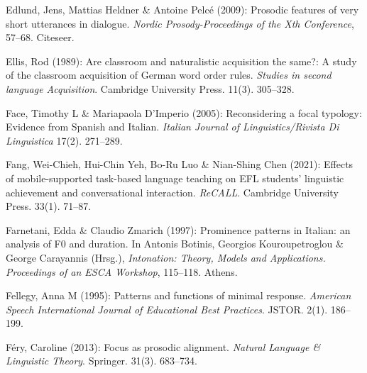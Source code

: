 \begin{styleBibliography}
Edlund, Jens, Mattias Heldner \& Antoine Pelcé (2009): Prosodic features of very short utterances in dialogue. \textit{Nordic Prosody-Proceedings of the Xth Conference}, 57–68. Citeseer.
\end{styleBibliography}

\begin{styleBibliography}
Ellis, Rod (1989): Are classroom and naturalistic acquisition the same?: A study of the classroom acquisition of German word order rules. \textit{Studies in second language Acquisition}. Cambridge University Press. 11(3). 305–328.
\end{styleBibliography}

\begin{styleBibliography}
Face, Timothy L \& Mariapaola D’Imperio (2005): Reconsidering a focal typology: Evidence from Spanish and Italian. \textit{Italian Journal of Linguistics/Rivista Di Linguistica} 17(2). 271–289.
\end{styleBibliography}

\begin{styleBibliography}
Fang, Wei-Chieh, Hui-Chin Yeh, Bo-Ru Luo \& Nian-Shing Chen (2021): Effects of mobile-supported task-based language teaching on EFL students’ linguistic achievement and conversational interaction. \textit{ReCALL}. Cambridge University Press. 33(1). 71–87.
\end{styleBibliography}

\begin{styleBibliography}
Farnetani, Edda \& Claudio Zmarich (1997): Prominence patterns in Italian: an analysis of F0 and duration. In Antonis Botinis, Georgios Kouroupetroglou \& George Carayannis (Hrsg.), \textit{Intonation: Theory, Models and Applications. Proceedings of an ESCA Workshop}, 115–118. Athens.
\end{styleBibliography}

\begin{styleBibliography}
Fellegy, Anna M (1995): Patterns and functions of minimal response. \textit{American Speech International Journal of Educational Best Practices}. JSTOR. 2(1). 186–199.
\end{styleBibliography}

\begin{styleBibliography}
Féry, Caroline (2013): Focus as prosodic alignment. \textit{Natural Language \& Linguistic Theory}. Springer. 31(3). 683–734.
\end{styleBibliography}

